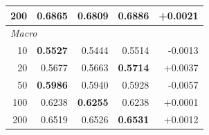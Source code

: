 \begin{table}[t]
{\begin{tabular}{rrrrr}
200 & 0.6865 & 0.6809 & \textbf{0.6886} & +0.0021 \\
\midrule
\multicolumn{5}{l}{\textit{Macro}} \\
10 & \textbf{0.5527} & 0.5444 & 0.5514 & -0.0013 \\
20 & 0.5677 & 0.5663 & \textbf{0.5714} & +0.0037 \\
50 & \textbf{0.5986} & 0.5940 & 0.5928 & -0.0057 \\
100 & 0.6238 & \textbf{0.6255} & 0.6238 & +0.0001 \\
200 & 0.6519 & 0.6526 & \textbf{0.6531} & +0.0012 \\
\bottomrule
\end{tabular}
}
\end{table}
